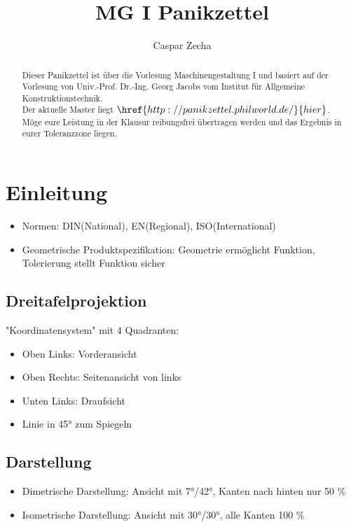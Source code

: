 \documentclass[a4paper,parskip=half*,DIV=7,fontsize=11pt]{scrartcl}
\title{MG I Panikzettel}
\author{Caspar Zecha}
\begin{document}
	
\maketitle
	
\begin{abstract}
	Dieser Panikzettel ist über die Vorlesung Maschinengestaltung I und basiert auf der Vorlesung von Univ.-Prof. Dr.-Ing. Georg Jacobs vom Institut für Allgemeine Konstruktionstechnik.\\
	Der aktuelle Master liegt $\href{http://panikzettel.philworld.de/}{hier}$.\\
	Möge eure Leistung in der Klausur reibungsfrei übertragen werden und das Ergebnis in eurer Toleranzzone liegen.\\
\end{abstract}
	
\tableofcontents
	
\pagebreak
	
\section{Einleitung}
\begin{itemize}
	\item Normen: DIN(National), EN(Regional), ISO(International)
	\item Geometrische Produktspezifikation: Geometrie ermöglicht Funktion, Tolerierung stellt Funktion sicher
\end{itemize}
	
\subsection{Dreitafelprojektion}
"Koordinatensystem" mit 4 Quadranten:
\begin{itemize}
	\item Oben Links: Vorderansicht
	\item Oben Rechts: Seitenansicht von links
	\item Unten Links: Draufsicht
	\item Linie in 45° zum Spiegeln
\end{itemize}
	
\subsection{Darstellung}
\begin{itemize}
	\item Dimetrische Darstellung: Ansicht mit 7°/42°, Kanten nach hinten nur 50 \%
	\item Isometrische Darstellung: Ansicht mit 30°/30°, alle Kanten 100 \%
\end{itemize}
	
\end{document}
